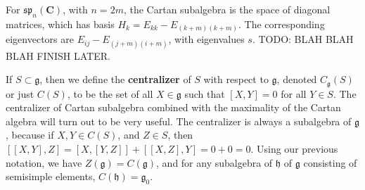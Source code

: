 \begin{example}
    For $\mathfrak{sp}_n(\mathbf{C})$, with $n = 2m$, the Cartan subalgebra is the space of diagonal matrices, which has basis $H_k = E_{kk} - E_{(k + m)(k+m)}$. The corresponding eigenvectors are $E_{ij} - E_{(j+m)(i+m)}$, with eigenvalues $s$. TODO: BLAH BLAH BLAH FINISH LATER.
\end{example}

If $S \subset \mathfrak{g}$, then we define the {\bf centralizer} of $S$ with respect to $\mathfrak{g}$, denoted $C_\mathfrak{g}(S)$ or just $C(S)$, to be the set of all $X \in \mathfrak{g}$ such that $[X,Y] = 0$ for all $Y \in S$. The centralizer of Cartan subalgebra combined with the maximality of the Cartan algebra will turn out to be very useful. The centralizer is always a subalgebra of $\mathfrak{g}$, because if $X,Y \in C(S)$, and $Z \in S$, then $[[X,Y],Z] = [X,[Y,Z]] + [[X,Z],Y] = 0 + 0 = 0$. Using our previous notation, we have $Z(\mathfrak{g}) = C(\mathfrak{g})$, and for any subalgebra of $\mathfrak{h}$ of $\mathfrak{g}$ consisting of semisimple elements, $C(\mathfrak{h}) = \mathfrak{g}_0$.

